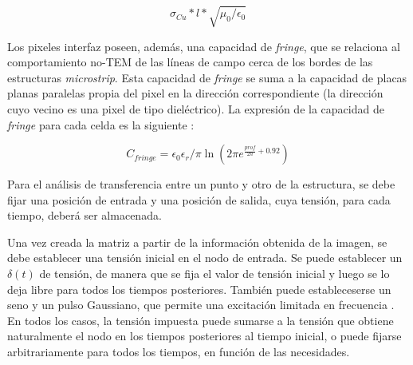 \begin{equation}
\sigma_{Cu} * l * \sqrt{\mu_0 / \epsilon_0}
\end{equation}

Los pixeles interfaz poseen, además, una capacidad de \textit{fringe}, que se relaciona al comportamiento no-TEM de las líneas de campo cerca de los bordes de las estructuras \textit{microstrip}. Esta capacidad de \textit{fringe} se suma a la capacidad de placas planas paralelas propia del pixel en la dirección correspondiente (la dirección cuyo vecino es una pixel de tipo dieléctrico). La expresión de la capacidad de \textit{fringe} para cada celda es la siguiente \cite{ThummWiesbeck:CharacteristicImpedance}:

\begin{equation}
	C_{fringe} = \epsilon_0 \epsilon_r / \pi \ln (2 \pi e^{\frac{prof}{2 h} + 0.92})
\end{equation}

Para el análisis de transferencia entre un punto y otro de la estructura, se debe fijar una posición de entrada y una posición de salida, cuya tensión, para cada tiempo, deberá ser almacenada.

Una vez creada la matriz a partir de la información obtenida de la imagen, se debe establecer una tensión inicial en el nodo de entrada. Se puede establecer un $\delta(t)$ de tensión, de manera que se fija el valor de tensión inicial y luego se lo deja libre para todos los tiempos posteriores. También puede estableceserse un seno y un pulso Gaussiano, que permite una excitación limitada en frecuencia \cite{Barthia:Handbook}. En todos los casos, la tensión impuesta puede sumarse a la tensión que obtiene naturalmente el nodo en los tiempos posteriores al tiempo inicial, o puede fijarse arbitrariamente para todos los tiempos, en función de las necesidades. 

